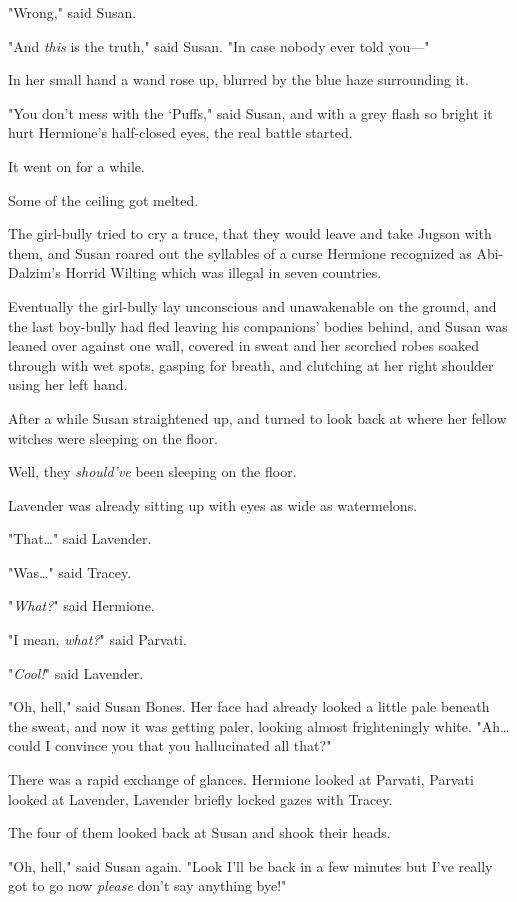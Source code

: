 "Wrong," said Susan.

"And \emph{this} is the truth," said Susan. "In case nobody ever told you---"

In her small hand a wand rose up, blurred by the blue haze surrounding it.

"You don't mess with the `Puffs," said Susan, and with a grey flash so bright
it hurt Hermione's half-closed eyes, the real battle started.

It went on for a while.

Some of the ceiling got melted.

The girl-bully tried to cry a truce, that they would leave and take Jugson with
them, and Susan roared out the syllables of a curse Hermione recognized as
Abi-Dalzim's Horrid Wilting which was illegal in seven countries.

Eventually the girl-bully lay unconscious and unawakenable on the ground, and
the last boy-bully had fled leaving his companions' bodies behind, and Susan
was leaned over against one wall, covered in sweat and her scorched robes
soaked through with wet spots, gasping for breath, and clutching at her right
shoulder using her left hand.

After a while Susan straightened up, and turned to look back at where her
fellow witches were sleeping on the floor.

Well, they \emph{should've} been sleeping on the floor.

Lavender was already sitting up with eyes as wide as watermelons.

"That{\ldots}" said Lavender.

"Was{\ldots}" said Tracey.

"\emph{What?}" said Hermione.

"I mean, \emph{what?}" said Parvati.

"\emph{Cool!}" said Lavender.

"Oh, hell," said Susan Bones. Her face had already looked a little pale beneath
the sweat, and now it was getting paler, looking almost frighteningly white.
"Ah{\ldots} could I convince you that you hallucinated all that?"

There was a rapid exchange of glances. Hermione looked at Parvati, Parvati
looked at Lavender, Lavender briefly locked gazes with Tracey.

The four of them looked back at Susan and shook their heads.

"Oh, hell," said Susan again. "Look I'll be back in a few minutes but I've
really got to go now \emph{please} don't say anything bye!"

